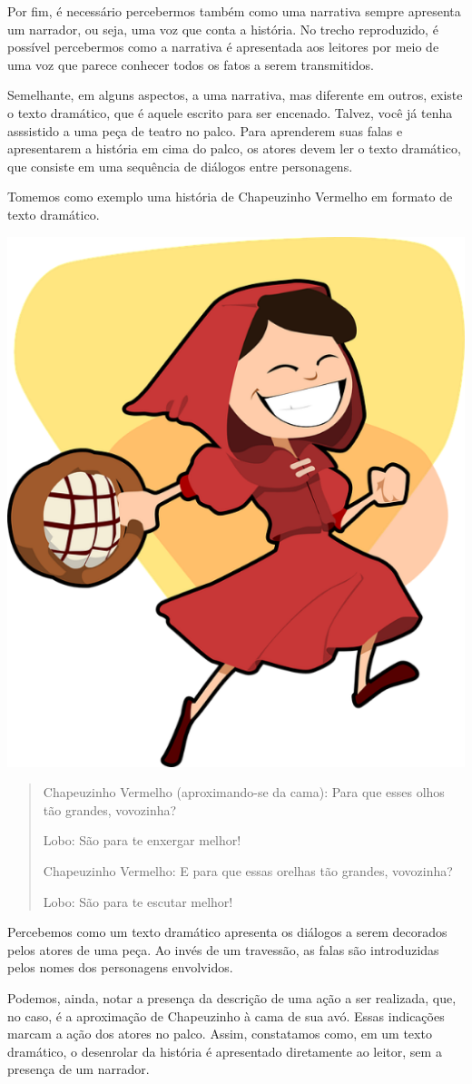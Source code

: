 {Por fim, é necessário percebermos também como uma narrativa sempre
apresenta um narrador, ou seja, uma voz que conta a história. No trecho
reproduzido, é possível percebermos como a narrativa é apresentada
aos leitores por meio de uma voz que parece conhecer todos os fatos a
serem transmitidos.

Semelhante, em alguns aspectos, a uma narrativa, mas diferente em outros, existe o texto dramático, que é aquele escrito para ser encenado. Talvez, você já tenha asssistido a uma peça de teatro no palco. Para aprenderem suas falas
e apresentarem a história em cima do palco, os atores devem ler o texto
dramático, que consiste em uma sequência de diálogos
entre personagens.

Tomemos como exemplo uma história de Chapeuzinho
Vermelho em formato de texto dramático.

\includegraphics[width=.5\textwidth]{./imgs/img5.png}

\begin{quote}
Chapeuzinho Vermelho (aproximando-se da cama): Para que esses olhos
tão grandes, vovozinha?

Lobo: São para te enxergar melhor!

Chapeuzinho Vermelho: E para que essas orelhas tão grandes, vovozinha?

Lobo: São para te escutar melhor!
\end{quote}

Percebemos como um texto dramático apresenta os diálogos a serem
decorados pelos atores de uma peça. Ao invés de um travessão, as falas são introduzidas pelos nomes dos personagens envolvidos.

Podemos, ainda, notar a presença da descrição de uma ação a ser realizada, que,
no caso, é a aproximação de Chapeuzinho à cama de sua avó. Essas indicações marcam a ação dos atores no palco. Assim,
constatamos como, em um texto dramático, o desenrolar da história é
apresentado diretamente ao leitor, sem a presença de um narrador.}

